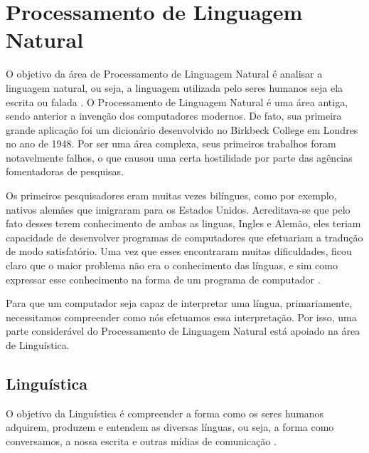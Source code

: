 \chapter{Processamento de Linguagem Natural}
\label{cap:Processamento}


O objetivo da área de Processamento de Linguagem Natural é analisar a linguagem
natural, ou seja, a linguagem utilizada pelo seres humanos seja ela escrita
ou falada \cite{manningschutze1999}. O Processamento de Linguagem Natural é uma
área antiga, sendo anterior a invenção dos computadores modernos. De fato, sua primeira grande aplicação foi
um dicionário desenvolvido no Birkbeck College em Londres no ano de 1948. Por ser
uma área complexa, seus primeiros trabalhos foram notavelmente falhos, o que
causou uma certa hostilidade por parte das agências fomentadoras de pesquisas.

Os primeiros pesquisadores eram muitas vezes bilíngues, como por exemplo,
nativos alemães que imigraram para os Estados Unidos. Acreditava-se que pelo
fato desses terem conhecimento de ambas as linguas, Ingles e Alemão, eles teriam
capacidade de desenvolver programas de computadores que efetuariam a tradução
de modo satisfatório. Uma vez que esses encontraram muitas dificuldades,
ficou claro que o maior problema não era o conhecimento das
línguas, e sim como expressar esse conhecimento na forma de um programa de
computador \cite{history}.

Para que um computador seja capaz de interpretar uma
língua, primariamente, necessitamos compreender como nós efetuamos essa
interpretação.
Por isso, uma parte considerável do Processamento de Linguagem Natural está apoiado na área de Linguística.

\section{Linguística}

O objetivo da Linguística é compreender a forma como os seres humanos adquirem,
produzem e entendem as diversas línguas, ou seja, a forma como conversamos, a nossa
escrita e outras mídias de comunicação \cite{manningschutze1999}.

\newpage


